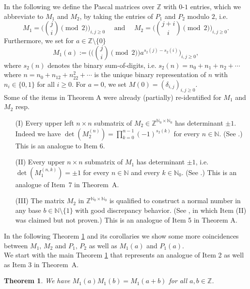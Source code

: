 \documentclass{article}
\newcommand{\NN}{\mathbb N}
\newcommand{\ZZ}{\mathbb Z}
\newtheorem{theorem}{Theorem}
\begin{document}
In the following we define the Pascal matrices over $\ZZ$ with $0$-$1$ entries, which we abbreviate to $M_1$ and $M_2$, by taking the entries of $P_1$ and $P_2$ modulo $2$, i.e. 
$$M_1=\Big(\binom{j}{i}\pmod{2}\Big)_{i,j\geq 0}\quad\mbox{ and }\quad M_2=\Big(\binom{j+i}{i}\pmod{2}\Big)_{i,j\geq 0}.$$
Furthermore, we set for $a\in\ZZ\setminus\{0\}$ 
$$M_1(a):=\Big(\big(\binom{j}{i}\pmod{2}\big) a^{s_2(j)-s_2(i)}\Big)_{i,j\geq 0},$$
where $s_2(n)$ denotes the binary sum-of-digits, i.e. $s_2(n)=n_0+n_1+n_2+\cdots$ where $n=n_0+n_12+n_22^2+\cdots$ is the unique binary representation of $n$ with $n_i\in\{0,1\}$ for all $i\geq 0$. For $a=0$, we set $M(0)=(\delta_{i,j})_{i,j\geq 0}$. \\

Some of the items in Theorem A were already (partially) re-identified for $M_1$ and $M_2$ resp.

	
	\begin{enumerate}
		\item[(I)] Every upper left $n\times n$ submatrix of $M_2\in\ZZ^{\NN_0\times\NN_0}$ has determinant $ \pm 1$. Indeed we have $\det(M_2^{(n)})=\prod_{k=0}^{n-1}(-1)^{s_2(k)}$ for every $n\in\NN$. (See \cite[Theorem 1.1 (i)]{BaCh}.) This is an analogue to Item 6.%
	\item[(II)] Every upper $n\times n$ submatrix of $M_1$ has determinant $ \pm 1$, i.e. $\det(M_1^{(n,k)})=\pm 1$ for every $n\in\NN$ and every $k\in\NN_0$. (See \cite[Theorem 1]{mereb}.) This is an analogue of Item~7 in Theorem~A. 
	\item[(III)] The matrix $M_2$ in $\ZZ^{\NN_0\times\NN_0}$ is qualified to construct a normal number in any base $b\in\NN\setminus\{1\}$ with good discrepancy behavior. (See \cite{levin99}, in which Item (II) was claimed but not proven.) This is an analogue of Item 5 in Theorem A.
	\end{enumerate}
	
In the following Theorem \ref{thm:1} and its corollaries we show some more coincidences between $M_1,\,M_2$ and $P_1,\,P_2$ as well as $M_1(a)$ and $P_1(a)$. \\
	
	We start with the main Theorem \ref{thm:1} that represents an analogue of Item 2 as well as Item 3 in Theorem~A. 
	
	\begin{theorem}\label{thm:1}
	We have $M_1(a)M_1(b)=M_1(a+b)$ for all $a,b\in\ZZ$. 
	\end{theorem}
	
\end{document}
